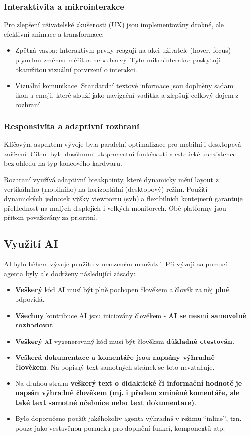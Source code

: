 \documentclass[12pt]{article}
\begin{document}
\subsubsection{Interaktivita a mikrointerakce}
Pro zlepšení uživatelské zkušenosti (UX) jsou implementovány drobné, ale efektivní animace a transformace:

\begin{itemize}
	\item{} Zpětná vazba: Interaktivní prvky reagují na akci uživatele (hover, focus) plynulou změnou měřítka nebo barvy. Tyto mikrointerakce poskytují okamžitou vizuální potvrzení o interakci.
	
	\item Vizuální komunikace: Standardní textové informace jsou doplněny sadami ikon a emoji, které slouží jako navigační vodítka a zlepšují celkový dojem z rozhraní.
\end{itemize}

\subsubsection{Responsivita a adaptivní rozhraní}
Klíčovým aspektem vývoje byla paralelní optimalizace pro mobilní i desktopová zařízení. Cílem bylo dosáhnout stoprocentní funkčnosti a estetické konzistence bez ohledu na typ koncového hardwaru.

Rozhraní využívá adaptivní breakpointy, které dynamicky mění layout z vertikálního (mobilního) na horizontální (desktopový) režim.
Použití dynamických jednotek výšky viewportu (svh) a flexibilních kontejnerů garantuje přehlednost na malých displejích i velkých monitorech. Obě platformy jsou přitom považovány za prioritní.

\subsection{Využití AI}
AI bylo během vývoje použito v omezeném množství. Při vývoji za pomocí agenta byly ale dodrženy následující zásady:
\begin{itemize}
	\item{} \textbf{Veškerý} kód AI musí být plně pochopen člověkem a člověk za něj \textbf{plně} odpovídá.
	\item{} \textbf{Všechny} kontribuce AI jsou iniciovány člověkem - \textbf{AI se nesmí samovolně rozhodovat}.
	\item{} \textbf{Veškerý} AI vygenerovaný kód musí být člověkem \textbf{důkladně otestován.}
	\item{} \textbf{Veškerá dokumentace a komentáře jsou napsány výhradně člověkem.} Na popisný text samotných stránek se toto nevztahuje.
	\item{} Na druhou stranu \textbf{veškerý text o didaktické či informační hodnotě je napsán výhradně člověkem (mj. i předem zmíněné komentáře, ale také text samotné učebnice nebo text dokumentace)}.
	\item{} Bylo doporučeno použít jakéhokoliv agenta výhradně v režimu \enquote{inline}, tzn. pouze jako vestavěnou pomůcku pro doplnění funkcí, komponentů atp.
\end{itemize}
\end{document}

